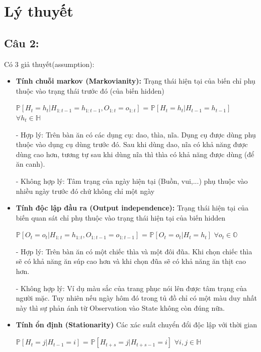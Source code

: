 \documentclass{article} %
\begin{document}
\section*{Lý thuyết}

\subsection*{Câu 2:}
Có 3 giả thuyết(assumption):
\begin{itemize}
    \item \textbf{Tính chuỗi markov (Markovianity):} 
    Trạng thái hiện tại của biến chỉ phụ thuộc vào trạng thái trước đó (của biến hidden)
    
    $\mathbb{P}[H_t = h_t | H_{1:t-1} = h_{1:t-1},O_{1:t} = o_{1:t}]$ =  $\mathbb{P}[H_t = h_t | H_{t-1} = h_{t-1}]$ \\$\forall h_t \in \mathbb{H}$
    
   - Hợp lý: Trên bàn ăn có các dụng cụ: dao, thìa, nĩa. Dụng cụ được dùng phụ thuộc vào dụng cụ dùng trước đó. Sau khi dùng dao, nĩa có khả năng được dùng cao hơn, tương tự sau khi dùng nĩa thì thìa có khả năng được dùng (để ăn canh).
   
   - Không hợp lý: Tâm trạng của ngày hiện tại (Buồn, vui,...) phụ thuộc vào nhiều ngày trước đó chứ không chỉ một ngày
    
    \item \textbf{Tính độc lập đầu ra (Output independence):} Trạng thái hiện tại của biến quan sát chỉ phụ thuộc vào trạng thái hiện tại của biến hidden
    
     $\mathbb{P}[O_t = o_t | H_{1:t} = h_{1:t},O_{1:t-1} = o_{1:t-1}]$ =  $\mathbb{P}[O_t = o_t | H_{t} = h_{t}]$ $\forall o_t \in \mathbb{O}$
     
     - Hợp lý: Trên bàn ăn có một chiếc thìa và một đôi đũa. Khi chọn chiếc thìa sẽ có khả năng ăn súp cao hơn và khi chọn đũa sẽ có khả năng ăn thịt cao hơn.
     
     - Không hợp lý: Ví dụ màu sắc của trang phục nói lên được tâm trạng của người mặc. Tuy nhiên nếu ngày hôm đó trong tủ đồ chỉ có một màu duy nhất này thì sự phản ánh từ Observation vào State không còn đúng nữa.
    
    \item \textbf{Tính ổn định (Stationarity)} Các xác suất chuyển đổi độc lập với thời gian
    
     $\mathbb{P}[H_t = j | H_{t-1} = i]$ =  $\mathbb{P}[H_{t+s} = j | H_{t+s-1} = i]$ $\forall i,j \in \mathbb{H}$
     

\end{itemize}
\end{document}

